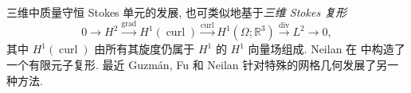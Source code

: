 {三维中质量守恒 Stokes 单元的发展, 也可类似地基于\emph{三维 Stokes 复形}}
\[
0\to H^2\xrightarrow{\operatorname{grad}}H^1(\operatorname{curl})\xrightarrow{\operatorname{curl}}H^1(\Omega;\mathbb R^3)\xrightarrow{\operatorname{div}}L^2\to0,
\]
{其中 $H^1(\operatorname{curl})$ 由所有其旋度仍属于 $H^1$ 的 $H^1$ 向量场组成. Neilan 在  中构造了一个有限元子复形. 最近 Guzmán, Fu 和 Neilan  针对特殊的网格几何发展了另一种方法.}
